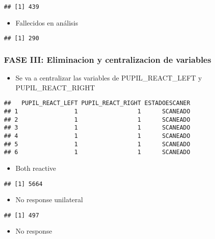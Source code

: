 \documentclass[]{article}
\providecommand{\tightlist}{%
  \setlength{\itemsep}{0pt}\setlength{\parskip}{0pt}}
\begin{document}
\begin{verbatim}
## [1] 439
\end{verbatim}

\begin{itemize}
\tightlist
\item
  Fallecidos en análisis
\end{itemize}

\begin{verbatim}
## [1] 290
\end{verbatim}

\subsubsection{FASE III: Eliminacion y centralizacion de
variables}\label{fase-iii-eliminacion-y-centralizacion-de-variables}

\begin{itemize}
\tightlist
\item
  Se va a centralizar las variables de PUPIL\_REACT\_LEFT y
  PUPIL\_REACT\_RIGHT
\end{itemize}

\begin{verbatim}
##   PUPIL_REACT_LEFT PUPIL_REACT_RIGHT ESTADOESCANER
## 1                1                 1      SCANEADO
## 2                1                 1      SCANEADO
## 3                1                 1      SCANEADO
## 4                1                 1      SCANEADO
## 5                1                 1      SCANEADO
## 6                1                 1      SCANEADO
\end{verbatim}

\begin{itemize}
\tightlist
\item
  Both reactive
\end{itemize}

\begin{verbatim}
## [1] 5664
\end{verbatim}

\begin{itemize}
\tightlist
\item
  No response unilateral
\end{itemize}

\begin{verbatim}
## [1] 497
\end{verbatim}

\begin{itemize}
\tightlist
\item
  No response
\end{itemize}
\end{document}
